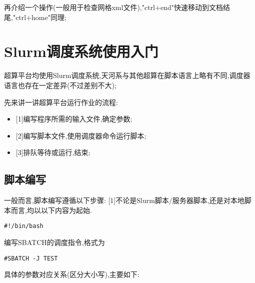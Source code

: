 再介绍一个操作(一般用于检查网格xml文件),"ctrl+end"快速移动到文档结尾,"ctrl+home"同理;\par



\section{Slurm调度系统使用入门}
超算平台均使用Slurm调度系统,天河系与其他超算在脚本语言上略有不同,调度器语言也存在一定差异(不过差别不大);\par

先来讲一讲超算平台运行作业的流程:\par
\begin{itemize}
	\item{[1]编写程序所需的输入文件,确定参数;}
\end{itemize}
\begin{itemize}
	\item{[2]编写脚本文件,使用调度器命令运行脚本;}
\end{itemize}
\begin{itemize}
	\item{[3]排队等待或运行,结束;}
\end{itemize}

\subsection{脚本编写}
一般而言,脚本编写遵循以下步骤:
[1]不论是Slurm脚本/服务器脚本,还是对本地脚本而言,均以以下内容为起始.
\begin{lstlisting}[frame=single]
	#!/bin/bash
\end{lstlisting}
\par
[2]编写SBATCH的调度指令,格式为
\begin{lstlisting}[frame=single]
	#SBATCH -J TEST
\end{lstlisting}
\par
具体的参数对应关系(区分大小写),主要如下:

